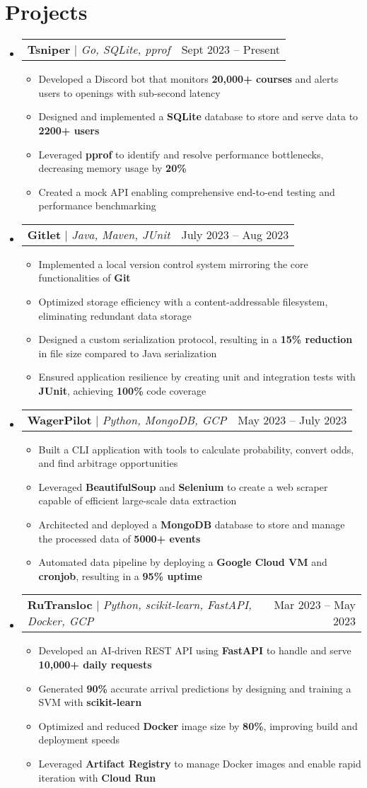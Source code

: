\documentclass[letterpaper,11pt]{article}
\makeatletter
\newcommand{\resumeItem}[1]{
  \item\small{
    {#1 \vspace{-2pt}}
  }
}
\newcommand{\resumeProjectHeading}[2]{
    \item
    \begin{tabular*}{0.97\textwidth}{l@{\extracolsep{\fill}}r}
      \small#1 & #2 \\
    \end{tabular*}\vspace{-7pt}
}
\newcommand{\resumeSubHeadingListStart}{\begin{itemize}[leftmargin=0.15in, label={}]}
\newcommand{\resumeSubHeadingListEnd}{\end{itemize}}
\newcommand{\resumeItemListStart}{\begin{itemize}}
\newcommand{\resumeItemListEnd}{\end{itemize}\vspace{-3pt}}
\makeatother
\begin{document}
\section{Projects}
    \resumeSubHeadingListStart
      \resumeProjectHeading
          {\textbf{Tsniper} $|$ \emph{Go, SQLite, pprof}}{Sept 2023 -- Present}
          \resumeItemListStart
            \resumeItem{Developed a Discord bot that monitors \textbf{20,000+ courses} and alerts users to openings with sub-second latency}
            \resumeItem{Designed and implemented a \textbf{SQLite} database to store and serve data to \textbf{2200+ users}}
            \resumeItem{Leveraged \textbf{pprof} to identify and resolve performance bottlenecks, decreasing memory usage by \textbf{20\%}}
            \resumeItem{Created a mock API enabling comprehensive end-to-end testing and performance benchmarking}
          \resumeItemListEnd
      \resumeProjectHeading
          {\textbf{Gitlet} $|$ \emph{Java, Maven, JUnit}}{July 2023 -- Aug 2023}
      \resumeItemListStart  
            \resumeItem{Implemented a local version control system mirroring the core functionalities of \textbf{Git}}
            \resumeItem{Optimized storage efficiency with a content-addressable filesystem, eliminating redundant data storage}
            \resumeItem{Designed a custom serialization protocol, resulting in a \textbf{15\% reduction} in file size compared to Java serialization}
            \resumeItem{Ensured application resilience by creating unit and integration tests with \textbf{JUnit}, achieving \textbf{100\%} code coverage}
          \resumeItemListEnd
      \resumeProjectHeading
          {\textbf{WagerPilot} $|$ \emph{Python, MongoDB, GCP}}{May 2023 -- July 2023}
          \resumeItemListStart
            \resumeItem{Built a CLI application with tools to calculate probability, convert odds, and find arbitrage opportunities}
            \resumeItem{Leveraged \textbf{BeautifulSoup} and \textbf{Selenium} to create a web scraper capable of efficient large-scale data extraction}
            \resumeItem{Architected and deployed a \textbf{MongoDB} database to store and manage the processed data of \textbf{5000+ events}}
            \resumeItem{Automated data pipeline by deploying a \textbf{Google Cloud VM} and \textbf{cronjob}, resulting in a \textbf{95\% uptime}}
          \resumeItemListEnd
      \resumeProjectHeading
          {\textbf{RuTransloc} $|$ \emph{Python, scikit-learn, FastAPI, Docker, GCP}}{Mar 2023 -- May 2023}
          \resumeItemListStart
            \resumeItem{Developed an AI-driven REST API using \textbf{FastAPI} to handle and serve \textbf{10,000+ daily requests}}
            \resumeItem{Generated \textbf{90\%} accurate arrival predictions by designing and training a SVM with \textbf{scikit-learn}}
            \resumeItem{Optimized and reduced \textbf{Docker} image size by \textbf{80\%}, improving build and deployment speeds}
            \resumeItem{Leveraged \textbf{Artifact Registry} to manage Docker images and enable rapid iteration with \textbf{Cloud Run}}
          \resumeItemListEnd
    \resumeSubHeadingListEnd
\end{document}
